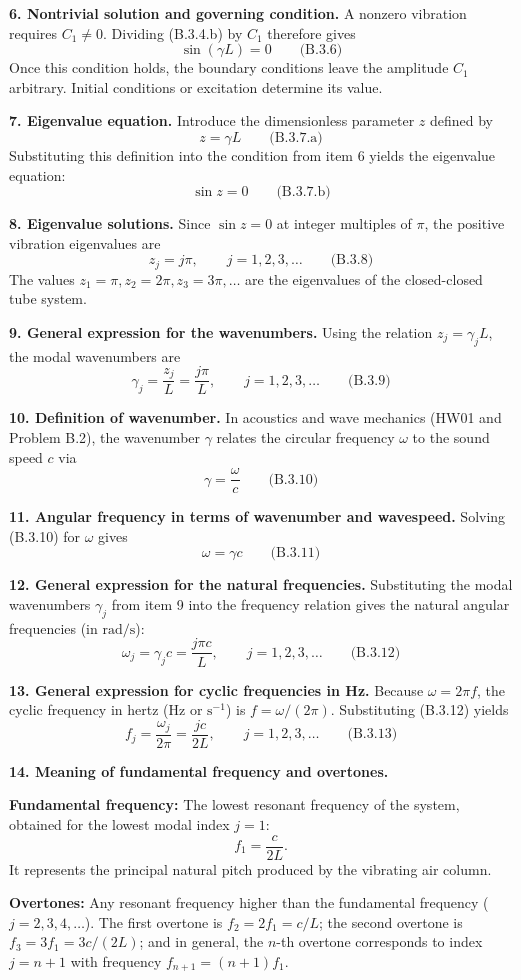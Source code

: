 \textbf{6. Nontrivial solution and governing condition.} A nonzero vibration requires $C_1\neq0$. Dividing (B.3.4.b) by $C_1$ therefore gives
\[
\boxed{\sin(\gamma L)=0}\qquad\text{(B.3.6)}
\]
Once this condition holds, the boundary conditions leave the amplitude $C_1$ arbitrary. Initial conditions or excitation determine its value.

\textbf{7. Eigenvalue equation.} Introduce the dimensionless parameter $z$ defined by
\[
\boxed{z=\gamma L}\qquad\text{(B.3.7.a)}
\]
Substituting this definition into the condition from item 6 yields the eigenvalue equation:
\[
\boxed{\sin z=0}\qquad\text{(B.3.7.b)}
\]

\textbf{8. Eigenvalue solutions.} Since $\sin z=0$ at integer multiples of $\pi$, the positive vibration eigenvalues are
\[
\boxed{z_j=j\pi,\qquad j=1,2,3,\ldots}\qquad\text{(B.3.8)}
\]
The values $z_1=\pi, z_2=2\pi, z_3=3\pi, \ldots$ are the eigenvalues of the closed-closed tube system.

\textbf{9. General expression for the wavenumbers.} Using the relation $z_j=\gamma_j L$, the modal wavenumbers are
\[
\boxed{\gamma_j=\frac{z_j}{L}=\frac{j\pi}{L},\qquad j=1,2,3,\ldots}\qquad\text{(B.3.9)}
\]

\textbf{10. Definition of wavenumber.} In acoustics and wave mechanics (HW01 and Problem B.2), the wavenumber $\gamma$ relates the circular frequency $\omega$ to the sound speed $c$ via
\[
\boxed{\gamma=\frac{\omega}{c}}\qquad\text{(B.3.10)}
\]

\textbf{11. Angular frequency in terms of wavenumber and wavespeed.} Solving (B.3.10) for $\omega$ gives
\[
\boxed{\omega=\gamma c}\qquad\text{(B.3.11)}
\]

\textbf{12. General expression for the natural frequencies.} Substituting the modal wavenumbers $\gamma_j$ from item 9 into the frequency relation gives the natural angular frequencies (in $\mathrm{rad/s}$):
\[
\boxed{\omega_j=\gamma_j c=\frac{j\pi c}{L},\qquad j=1,2,3,\ldots}\qquad\text{(B.3.12)}
\]

\textbf{13. General expression for cyclic frequencies in Hz.} Because $\omega=2\pi f$, the cyclic frequency in hertz ($\mathrm{Hz}$ or $\mathrm{s}^{-1}$) is $f=\omega/(2\pi)$. Substituting (B.3.12) yields
\[
\boxed{f_j=\frac{\omega_j}{2\pi}=\frac{jc}{2L},\qquad j=1,2,3,\ldots}\qquad\text{(B.3.13)}
\]

\textbf{14. Meaning of fundamental frequency and overtones.}
\par\smallskip\noindent
\textbf{Fundamental frequency:} The lowest resonant frequency of the system, obtained for the lowest modal index $j=1$:
\[
f_1=\frac{c}{2L}.
\]
It represents the principal natural pitch produced by the vibrating air column.
\par\smallskip\noindent
\textbf{Overtones:} Any resonant frequency higher than the fundamental frequency ($j=2,3,4,\ldots$). The first overtone is $f_2=2f_1=c/L$; the second overtone is $f_3=3f_1=3c/(2L)$; and in general, the $n$-th overtone corresponds to index $j=n+1$ with frequency $f_{n+1}=(n+1)f_1$.

